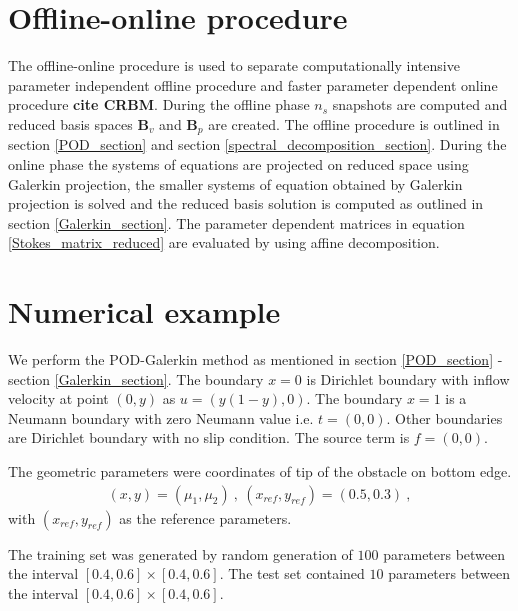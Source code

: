 \documentclass[graybox]{svmult}
\begin{document}
\section{Offline-online procedure}

The offline-online procedure is used to separate computationally intensive parameter independent offline procedure and faster parameter dependent online procedure \textbf{cite CRBM}. During the offline phase $n_s$ snapshots are computed and reduced basis spaces $\bm{B}_v$ and $\bm{B}_p$ are created. The offline procedure is outlined in section \ref{POD_section} and section \ref{spectral_decomposition_section}. During the online phase the systems of equations are projected on reduced space using Galerkin projection, the smaller systems of equation obtained by Galerkin projection is solved and the reduced basis solution is computed as outlined in section \ref{Galerkin_section}. The parameter dependent matrices in equation \eqref{Stokes_matrix_reduced} are evaluated by using affine decomposition.

\section{Numerical example}

We perform the POD-Galerkin method as mentioned in section \ref{POD_section} - section \ref{Galerkin_section}. The boundary ${x=0}$ is Dirichlet boundary with inflow velocity at point $(0,y)$ as $u = (y(1-y), 0)$. The boundary ${x = 1}$ is a Neumann boundary with zero Neumann value i.e. $t = (0, 0)$. Other boundaries are Dirichlet boundary with no slip condition. The source term is $f = (0,0)$.

The geometric parameters were coordinates of tip of the obstacle on bottom edge.
\begin{gather*}
(x,y) = (\mu_1,\mu_2) \ , \ (x_{ref},y_{ref}) = (0.5,0.3) \ ,
\end{gather*}
with $(x_{ref},y_{ref})$ as the reference parameters.

The training set was generated by random generation of $100$ parameters between the interval $[0.4,0.6] \times [0.4,0.6]$. The test set contained $10$ parameters between the interval $[0.4,0.6] \times [0.4,0.6]$.
\end{document}
